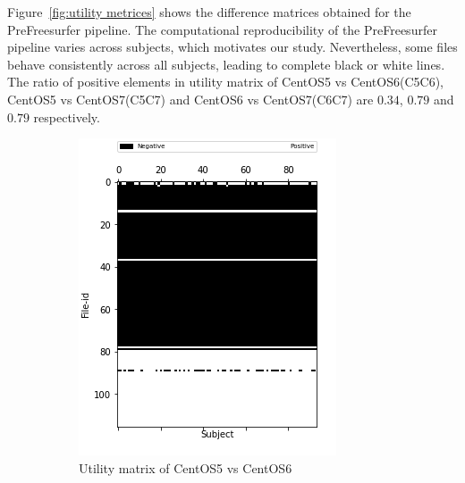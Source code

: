 \documentclass[10pt, conference, compsocconf]{IEEEtran}
\begin{document}
Figure~\ref{fig:utility metrices} shows the difference matrices
obtained for the PreFreesurfer pipeline. The computational
reproducibility of the PreFreesurfer pipeline varies across subjects,
which motivates our study. Nevertheless, some files behave
consistently across all subjects, leading to complete black or white
lines. The ratio of positive elements in utility matrix of CentOS5 vs CentOS6(C5C6),  CentOS5 vs CentOS7(C5C7) and  CentOS6 vs CentOS7(C6C7) are
$0.34$, $0.79$ and $0.79$ respectively.

\begin{figure}
  \centering
  \begin{subfigure}[b]{0.5\linewidth}
	\includegraphics[width=\columnwidth]{figures/utility_5vs6_PFS}
  \caption{Utility matrix of CentOS5 vs CentOS6}
  \end{subfigure}
  \begin{subfigure}[b]{0.5\linewidth}

\end{subfigure}
\end{figure}
\end{document}
